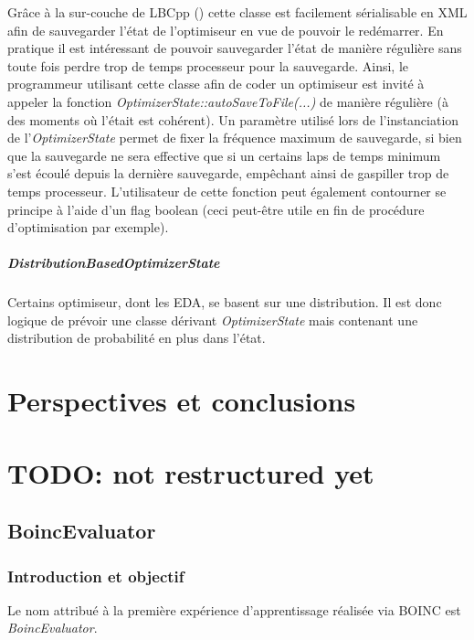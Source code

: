 \documentclass[a4paper, 11pt]{report}
\begin{document}
Grâce à la sur-couche de LBCpp ()%
cette classe est facilement sérialisable en XML afin de sauvegarder l'état de l'optimiseur en vue de pouvoir le redémarrer. En pratique il est intéressant de pouvoir sauvegarder l'état de manière régulière sans toute fois perdre trop de temps processeur pour la sauvegarde. Ainsi, le programmeur utilisant cette classe afin de coder un optimiseur est invité à appeler la fonction \textit{OptimizerState::autoSaveToFile(...)} de manière régulière (à des moments où l'était est cohérent). Un paramètre utilisé lors de l'instanciation de l'\textit{OptimizerState} permet de fixer la fréquence maximum de sauvegarde, si bien que la sauvegarde ne sera effective que si un certains laps de temps minimum s'est écoulé depuis la dernière sauvegarde, empêchant ainsi de gaspiller trop de temps processeur. L'utilisateur de cette fonction peut également contourner se principe à l'aide d'un flag boolean (ceci peut-être utile en fin de procédure d'optimisation par exemple). 

\paragraph{DistributionBasedOptimizerState}
Certains optimiseur, dont les EDA, se basent sur une distribution. Il est donc logique de prévoir une classe dérivant \textit{OptimizerState} mais contenant une distribution de probabilité en plus dans l'état.





\chapter{Perspectives et conclusions}

\chapter{TODO: not restructured yet}


\section{BoincEvaluator}
\subsection{Introduction et objectif}
Le nom attribué à la première expérience d'apprentissage réalisée via \textsc{BOINC} est \textit{BoincEvaluator}.
\end{document}
